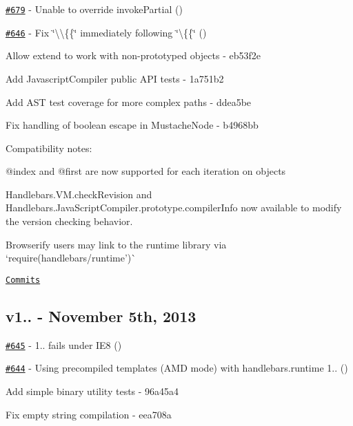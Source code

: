 \begin{DoxyItemize}
\item \href{https://github.com/wycats/handlebars.js/issues/679}{\tt \#679} -\/ Unable to override invoke\+Partial (\href{https://api.github.com/users/mattbrailsford}{\tt })
\item \href{https://github.com/wycats/handlebars.js/pull/646}{\tt \#646} -\/ Fix \char`\"{}\textbackslash{}\textbackslash{}\{\{\char`\"{} immediately following \char`\"{}\textbackslash{}\{\{\char`\"{} (\href{https://api.github.com/users/dmarcotte}{\tt })
\item Allow extend to work with non-\/prototyped objects -\/ eb53f2e
\item Add Javascript\+Compiler public A\+PI tests -\/ 1a751b2
\item Add A\+ST test coverage for more complex paths -\/ ddea5be
\item Fix handling of boolean escape in Mustache\+Node -\/ b4968bb
\end{DoxyItemize}

Compatibility notes\+:
\begin{DoxyItemize}
\item {\ttfamily @index} and {\ttfamily @first} are now supported for {\ttfamily each} iteration on objects
\item {\ttfamily Handlebars.\+V\+M.\+check\+Revision} and {\ttfamily Handlebars.\+Java\+Script\+Compiler.\+prototype.\+compiler\+Info} now available to modify the version checking behavior.
\item Browserify users may link to the runtime library via `require(\textquotesingle{}handlebars/runtime')\`{}
\end{DoxyItemize}

\href{https://github.com/wycats/handlebars.js/compare/v1.1.2...v1.2.0}{\tt Commits}

\subsection*{v1.. -\/ November 5th, 2013}


\begin{DoxyItemize}
\item \href{https://github.com/wycats/handlebars.js/issues/645}{\tt \#645} -\/ 1.. fails under I\+E8 (\href{https://api.github.com/users/kpdecker}{\tt })
\item \href{https://github.com/wycats/handlebars.js/issues/644}{\tt \#644} -\/ Using precompiled templates (A\+MD mode) with handlebars.\+runtime 1.. (\href{https://api.github.com/users/fddima}{\tt })
\item Add simple binary utility tests -\/ 96a45a4
\item Fix empty string compilation -\/ eea708a
\end{DoxyItemize}

